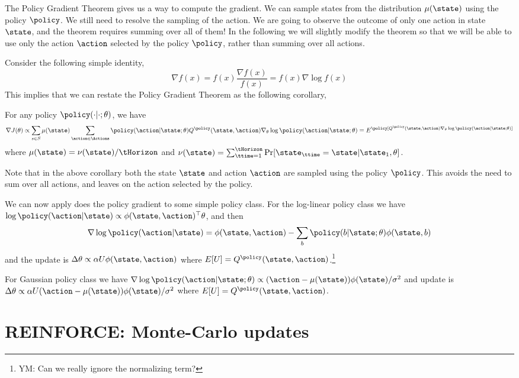 The Policy Gradient Theorem gives us a way to compute the gradient.
We can sample states from the distribution $\mu(\state)$ using the
policy $\policy$. We still need to resolve the sampling of the
action. We are going to observe the outcome of only one action in
state $\state$, and the theorem requires summing over all of them!
In the following we will slightly modify the theorem so that we will
be able to use only the action $\action$ selected by the policy
$\policy$, rather than summing over all actions.

Consider the following simple identity,
\[
\nabla f(x)=f(x)\frac{\nabla f(x)}{f(x)}=f(x)\nabla \log f(x)
\]
This implies that we can restate the Policy Gradient Theorem as the
following corollary,
\begin{corollary}
\label{thm:policy-gradient} For any policy
$\policy(\cdot|\cdot;\theta)$, we have
\[
\nabla J(\theta)\propto \sum_{s\in S} \mu(\state) \sum_{\action\in
\Actions} \policy(\action|\state;\theta) Q^\policy
(\state,\action)\nabla_\theta \log \policy(\action|\state;\theta) =
E^\policy[Q^\policy (\state,\action)\nabla_\theta \log
\policy(\action|\state;\theta)]
\]
where $\mu(\state)=\nu(\state)/\tHorizon$ and
$\nu(\state)=\sum_{\ttime=1}^\tHorizon\Pr[\state_\ttime=\state|\state_1,\theta]$.
\end{corollary}
Note that in the above corollary both the state $\state$ and action
$\action$ are sampled using the policy $\policy$. This avoids the
need to sum over all actions, and leaves on the action selected by
the policy.

We can now apply does the policy gradient to some simple policy
class. For the log-linear policy class we have $\log
\policy(\action|\state)\propto \phi(\state,\action)^\top \theta$,
and then
\[
\nabla \log \policy(\action|\state)= \phi(\state,\action)-\sum_b
\policy(b|\state;\theta) \phi(\state,b)
\]
and the update is $\Delta\theta \propto \alpha U
\phi(\state,\action)$ where
$E[U]=Q^\policy(\state,\action)$.\footnote{YM: Can we  really ignore
the normalizing term?}

 For Gaussian policy class we have $\nabla \log \policy(\action|\state;\theta)\propto
(\action-\mu(\state))\phi(\state)/\sigma^2$ and update is
$\Delta\theta \propto \alpha U
(\action-\mu(\state))\phi(\state)/\sigma^2$ where
$E[U]=Q^\policy(\state,\action)$.

\section{REINFORCE: Monte-Carlo updates}

